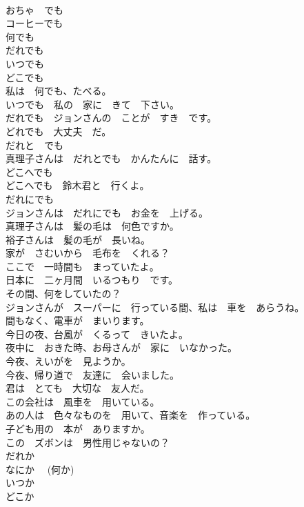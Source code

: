\documentclass[8pt]{extreport}
\begin{document}
\begin{CJK}{UTF8}{min}
\\	おちゃ　でも	
\\	コーヒーでも	
\\	何でも	
\\	だれでも	
\\	いつでも	
\\	どこでも	
\\	私は　何でも、たべる。	
\\	いつでも　私の　家に　きて　下さい。	
\\	だれでも　ジョンさんの　ことが　すき　です。	
\\	どれでも　大丈夫　だ。	
\\	だれと　でも	
\\	真理子さんは　だれとでも　かんたんに　話す。	
\\	どこへでも	
\\	どこへでも　鈴木君と　行くよ。	
\\	だれにでも	
\\	ジョンさんは　だれにでも　お金を　上げる。	
\\	真理子さんは　髪の毛は　何色ですか。	
\\	裕子さんは　髪の毛が　長いね。	
\\	家が　さむいから　毛布を　くれる？	
\\	ここで　一時間も　まっていたよ。	
\\	日本に　二ヶ月間　いるつもり　です。	
\\	その間、何をしていたの？	
\\	ジョンさんが　スーパーに　行っている間、私は　車を　あらうね。	
\\	間もなく、電車が　まいります。	
\\	今日の夜、台風が　くるって　きいたよ。	
\\	夜中に　おきた時、お母さんが　家に　いなかった。	
\\	今夜、えいがを　見ようか。	
\\	今夜、帰り道で　友達に　会いました。	
\\	君は　とても　大切な　友人だ。	
\\	この会社は　風車を　用いている。	
\\	あの人は　色々なものを　用いて、音楽を　作っている。	
\\	子ども用の　本が　ありますか。	
\\	この　ズボンは　男性用じゃないの？	
\\	だれか	
\\	なにか　 (何か)	
\\	いつか	
\\	どこか	

\end{CJK}
\end{document}
